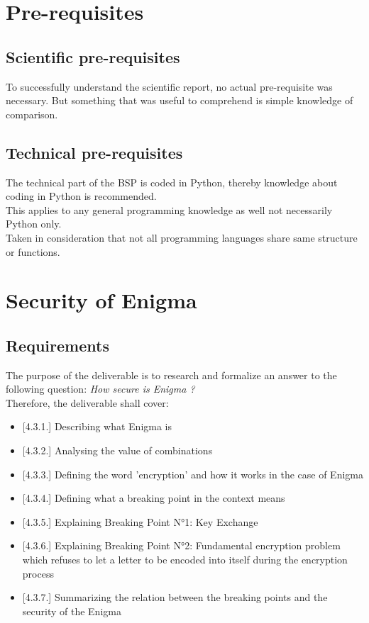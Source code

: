 \documentclass[conference,compsoc]{IEEEtran}
\begin{document}
\section{Pre-requisites}

\subsection{Scientific pre-requisites}
To successfully understand the scientific report, no actual pre-requisite was necessary.
But something that was useful to comprehend is simple knowledge of comparison.
\subsection{Technical pre-requisites}
The technical part of the BSP is coded in Python, thereby knowledge about coding in Python is recommended.\\
This applies to any general programming knowledge as well not necessarily Python only.\\
Taken in consideration that not all programming languages share same structure or functions.\\


\section{ Security of Enigma}
\label{sec-production}
\subsection{Requirements}
The purpose of the deliverable is to research and formalize an answer to the following question: \emph{How secure is Enigma ?}\\
Therefore, the deliverable shall cover:
\begin{itemize}
    \item{[4.3.1.]} Describing what Enigma is
    \item{[4.3.2.]} Analysing the value of combinations
    \item{[4.3.3.]} Defining the word 'encryption' and how it works in the case of Enigma
    \item{[4.3.4.]} Defining what a breaking point in the context means
    \item{[4.3.5.]} Explaining Breaking Point N°1: Key Exchange
    \item{[4.3.6.]} Explaining Breaking Point N°2: Fundamental encryption problem which refuses to let a letter to be encoded into itself during the encryption process
    \item{[4.3.7.]} Summarizing the relation between the breaking points and the security of the Enigma
\end{itemize}
\end{document}
